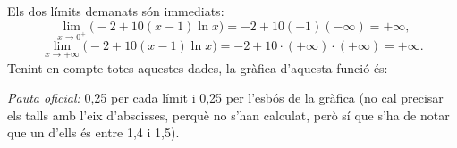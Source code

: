 \begin{apartats}
\begin{solucio}
Els dos límits demanats són immediats:
\[
\lim_{x\to0^+}\bigl(-2+10(x-1)\ln x\bigr)=-2+10(-1)(-\infty)=+\infty,
\]
\[
\lim_{x\to+\infty}\bigl(-2+10(x-1)\ln x\bigr)=-2+10\cdot(+\infty)\cdot(+\infty)=+\infty .
\]
Tenint en compte totes aquestes dades, la gràfica d'aquesta funció és:
\begin{center}
\end{center}

\textit{Pauta oficial:} 0,25 per cada límit i 0,25 per l'esbós de la gràfica (no cal precisar els talls amb
l'eix d'abscisses, perquè no s'han calculat, però sí que s'ha de notar que un d'ells és entre 1,4 i 1,5).
\end{solucio}

\end{apartats}
